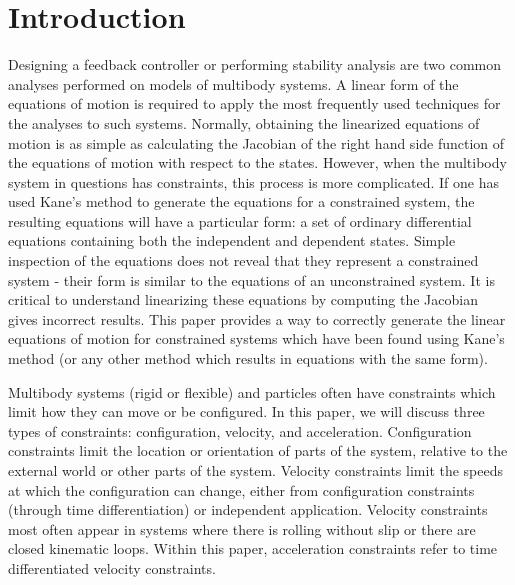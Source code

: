 \documentclass[smallcondensed,final]{svjour3}                     %
\begin{document}

\section{Introduction}
\label{sec:intro}
Designing a feedback controller or performing stability analysis are two common
analyses performed on models of multibody systems.
A linear form of the equations of motion is required to apply the most
frequently used techniques for the analyses to such systems.
Normally, obtaining the linearized equations of motion is as simple as
calculating the Jacobian of the right hand side function of the equations of
motion with respect to the states.
However, when the multibody system in questions has constraints, this process
is more complicated.
If one has used Kane's method \cite{Kane1985} to generate the equations for a
constrained system, the resulting equations will have a particular form: a set
of ordinary differential equations containing both the independent and
dependent states.
Simple inspection of the equations does not reveal that they represent a
constrained system - their form is similar to the equations of an unconstrained
system.
It is critical to understand linearizing these equations by computing the
Jacobian gives incorrect results.
This paper provides a way to correctly generate the linear equations of motion
for constrained systems which have been found using Kane's method (or any other
method which results in equations with the same form).

Multibody systems (rigid or flexible) and particles often have constraints
which limit how they can move or be configured.
In this paper, we will discuss three types of constraints: configuration,
velocity, and acceleration.
Configuration constraints limit the location or orientation of parts of the
system, relative to the external world or other parts of the system.
Velocity constraints limit the speeds at which the configuration can change,
either from configuration constraints (through time differentiation) or
independent application.
Velocity constraints most often appear in systems where there is rolling
without slip or there are closed kinematic loops.
Within this paper, acceleration constraints refer to time differentiated
velocity constraints.
\end{document}
